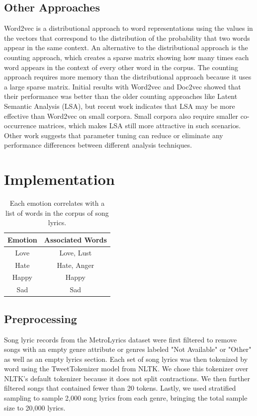 \documentclass[10pt,twocolumn]{article}
\begin{document}
\subsection{Other Approaches}
Word2vec is a distributional approach to word representations using the values in the vectors that correspond to the distribution of the probability that two words appear in the same context.  An alternative to the distributional approach is the counting approach, which creates a sparse matrix showing how many times each word appears in the context of every other word in the corpus.  The counting approach requires more memory than the distributional approach because it uses a large sparse matrix.  Initial results with Word2vec and Doc2vec showed that their performance was better than the older counting approaches like Latent Semantic Analysis (LSA), but recent work indicates that LSA may be more effective than Word2vec on small corpora. \cite{a10}  Small corpora also require smaller co-occurrence matrices, which makes LSA still more attractive in such scenarios.  Other work suggests that parameter tuning can reduce or eliminate any performance differences between different analysis techniques. \cite{a11}
  
\section{Implementation}


\begin{table}[!hb]
\begin{center}
 \begin{tabular}{ | c | c | } 
 \hline
\textbf{Emotion} & \textbf{Associated Words} \\ [0.5ex] 
 \hline
Love & Love, Lust \\ 
 \hline
Hate & Hate, Anger \\ 
 \hline
Happy & Happy \\ 
 \hline
Sad & Sad \\ 
 \hline
\end{tabular}
\caption{Each emotion correlates with a list of words in the corpus of song lyrics.}
\end{center}
\end{table}

\subsection{Preprocessing}

Song lyric records from the MetroLyrics dataset were first filtered to remove songs with an empty genre attribute or genres labeled "Not Available" or "Other" as well as an empty lyrics section.  Each set of song lyrics was then tokenized by word using the TweetTokenizer model from NLTK.  We chose this tokenizer over NLTK's default tokenizer because it does not split contractions.  We then further filtered songs that contained fewer than 20 tokens.  Lastly, we used stratified sampling to sample 2,000 song lyrics from each genre, bringing the total sample size to 20,000 lyrics.  
\end{document}
